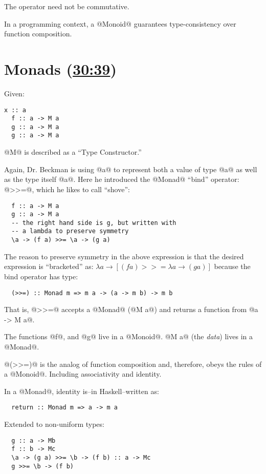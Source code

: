 The operator need not be commutative.

In a programming context, a @Monoid@ guarantees type-consistency over function composition.

\section{Monads (\href{https://youtu.be/ZhuHCtR3xq8?t=7m50s}{30:39})}

Given:
\begin{lstlisting}[frame=trBL, framerule=1pt, label=defM]
  x :: a
  f :: a -> M a
  g :: a -> M a
  g :: a -> M a
\end{lstlisting}
@M@ is described as a ``Type Constructor.''

Again, Dr. Beckman is using @a@ to represent both a value of type @a@ as well
as the type itself @a@.  Here he introduced the @Monad@ ``bind'' operator:
@>>=@, which he likes to call ``shove'':
\begin{lstlisting}
  f :: a -> M a
  g :: a -> M a
  -- the right hand side is g, but written with
  -- a lambda to preserve symmetry
  \a -> (f a) >>= \a -> (g a)
\end{lstlisting}

The reason to preserve symmetry in the above expression is that the desired expression is ``bracketed'' as:
\begin{math}
  \lambda a \rightarrow [(f a) >>= \lambda a \rightarrow (g a)]
\end{math}
because the bind operator has type:
\begin{lstlisting}
  (>>=) :: Monad m => m a -> (a -> m b) -> m b
\end{lstlisting}
That is, @>>=@ accepts a @Monad@ (@M a@) and returns a function from
@a -> M a@.

The functions @f@, and @g@ live in a @Monoid@.  @M a@ (the \emph{data}) lives
in a @Monad@.

@(>>=)@ is the analog of function composition and, therefore, obeys the rules of a @Monoid@.  Including associativity and identity.

In a @Monad@, identity is--in Haskell--written as:
\begin{lstlisting}
  return :: Monad m => a -> m a
\end{lstlisting}

Extended to non-uniform types:
\begin{lstlisting}
  g :: a -> Mb
  f :: b -> Mc
  \a -> (g a) >>= \b -> (f b) :: a -> Mc
  g >>= \b -> (f b)
\end{lstlisting}
